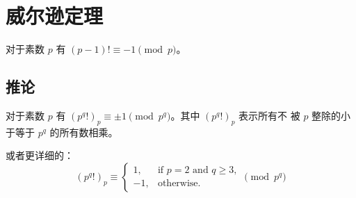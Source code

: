 \section{威尔逊定理} \label{sec:威尔逊定理}
对于素数 $p$ 有 $(p - 1)! \equiv -1 \pmod p$。

\subsection{推论}
对于素数 $p$ 有 $(p^q!)_p \equiv \pm 1 \pmod {p^q}$。其中 $(p^q!)_p$ 表示所有不
被 $p$ 整除的小于等于 $p^q$ 的所有数相乘。

或者更详细的：\[
    (p^q!)_p\equiv \begin{cases}
        1,  & \text{if }p=2\text{ and }q\geq 3,\\
        -1, & \text{otherwise}.
    \end{cases} \pmod{p^q}
\]


